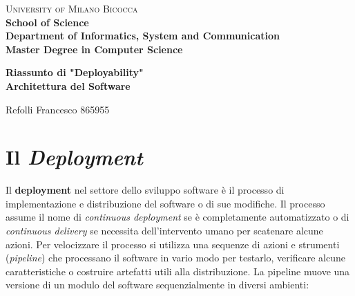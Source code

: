 \documentclass[a4paper,11pt,oneside, table]{article}
\begin{document}
  \noindent
  \begin{minipage}[t]{0.19\textwidth}
  \end{minipage}
  \begin{minipage}[t]{0.81\textwidth}
    {
      {\textsc{University of Milano Bicocca}} \\
      \textbf{School of Science} \\
      \textbf{Department of Informatics, System and Communication} \\
      \textbf{Master Degree in Computer Science} \\
      \par
    }
  \end{minipage}
  \begin{center}
    {\LARGE{
      \textbf{Riassunto di "Deployability"} \\
      \textbf{Architettura del Software}
      \par
    }}
  \end{center}
  \begin{center}
    \large{Refolli Francesco} \large{865955}
  \end{center}

  \renewcommand{\baselinestretch}{1.5}

  \section{Il \textit{Deployment}}

  Il \textbf{deployment} nel settore dello sviluppo software \`e il processo di implementazione e distribuzione del software o di sue modifiche. Il processo assume il nome di \textit{continuous deployment} se \`e completamente automatizzato o di \textit{continuous delivery} se necessita dell'intervento umano per scatenare alcune azioni. Per velocizzare il processo si utilizza una sequenze di azioni e strumenti (\textit{pipeline}) che processano il software in vario modo per testarlo, verificare alcune caratteristiche o costruire artefatti utili alla distribuzione. La pipeline muove una versione di un modulo del software sequenzialmente in diversi ambienti:
\end{document}
